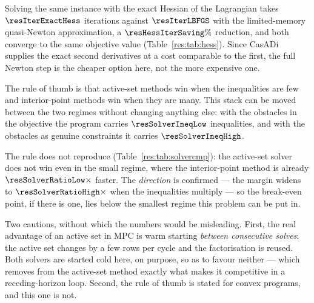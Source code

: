 
\label{res:hess}


Solving the same instance with the exact Hessian of the Lagrangian takes $\resIterExactHess$ iterations against $\resIterLBFGS$ with the limited-memory quasi-Newton approximation, a $\resHessIterSaving\%$ reduction, and both converge to the same objective value (Table~\ref{res:tab:hess}). Since CasADi supplies the exact second derivatives at a cost comparable to the first, the full Newton step is the cheaper option here, not the more expensive one.


\label{res:solvercmp}


The rule of thumb is that active-set methods win when the inequalities are few and interior-point methods win when they are many. This stack can be moved between the two regimes without changing anything else: with the obstacles in the objective the program carries $\resSolverIneqLow$ inequalities, and with the obstacles as genuine constraints it carries $\resSolverIneqHigh$.

The rule does not reproduce (Table~\ref{res:tab:solvercmp}): the active-set solver does not win even in the small regime, where the interior-point method is already $\resSolverRatioLow\times$ faster. The \emph{direction} is confirmed --- the margin widens to $\resSolverRatioHigh\times$ when the inequalities multiply --- so the break-even point, if there is one, lies below the smallest regime this problem can be put in.

Two cautions, without which the numbers would be misleading. First, the real advantage of an active set in MPC is warm starting \emph{between consecutive solves}: the active set changes by a few rows per cycle and the factorisation is reused. Both solvers are started cold here, on purpose, so as to favour neither --- which removes from the active-set method exactly what makes it competitive in a receding-horizon loop. Second, the rule of thumb is stated for convex programs, and this one is not.

